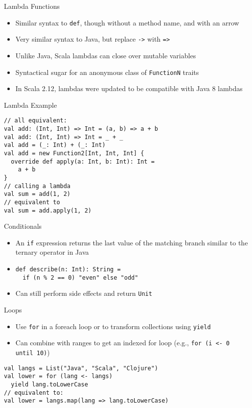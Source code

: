 \documentclass{beamer}
\begin{document}
\begin{frame}[fragile]{Lambda Functions}
\begin{itemize}
\item Similar syntax to \lstinline{def}, though without a method name, and with an arrow
\item Very similar syntax to Java, but replace \lstinline{->} with \lstinline{=>}
\item Unlike Java, Scala lambdas can close over mutable variables
\item Syntactical sugar for an anonymous class of \lstinline{FunctionN} traits
\item In Scala 2.12, lambdas were updated to be compatible with Java 8 lambdas
\end{itemize}
\end{frame}

\begin{frame}[fragile]{Lambda Example}
\begin{lstlisting}
// all equivalent:
val add: (Int, Int) => Int = (a, b) => a + b
val add: (Int, Int) => Int = _ + _
val add = (_: Int) + (_: Int)
val add = new Function2[Int, Int, Int] {
  override def apply(a: Int, b: Int): Int =
    a + b
}
// calling a lambda
val sum = add(1, 2)
// equivalent to
val sum = add.apply(1, 2)
\end{lstlisting}
\end{frame}

\begin{frame}[fragile]{Conditionals}
\begin{itemize}
\item An \lstinline{if} expression returns the last value of the matching branch similar
to the ternary operator in Java
\item
\begin{lstlisting}
def describe(n: Int): String =
  if (n % 2 == 0) "even" else "odd"
\end{lstlisting}
\item Can still perform side effects and return \lstinline{Unit}
\end{itemize}
\end{frame}

\begin{frame}[fragile]{Loops}
\begin{itemize}
\item Use \lstinline{for} in a foreach loop or to transform collections using \lstinline{yield}
\item Can combine with ranges to get an indexed for loop (e.g., \lstinline{for (i <- 0 until 10)})
\end{itemize}
\begin{lstlisting}
val langs = List("Java", "Scala", "Clojure")
val lower = for (lang <- langs)
  yield lang.toLowerCase
// equivalent to:
val lower = langs.map(lang => lang.toLowerCase)
\end{lstlisting}
\end{frame}
\end{document}
